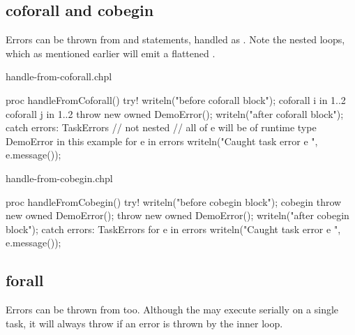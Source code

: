 \subsection{coforall and cobegin}
\label{Errors_coforall_and_cobegin}

Errors can be thrown from  and  statements, handled
as . Note the nested  loops, which as mentioned
earlier will emit a flattened .

\begin{chapelexample}{handle-from-coforall.chpl}
\begin{chapel}
proc handleFromCoforall() {
  try! {
    writeln("before coforall block");
    coforall i in 1..2 {
      coforall j in 1..2 {
        throw new owned DemoError();
      }
    }
    writeln("after coforall block");
  } catch errors: TaskErrors { // not nested
    // all of e will be of runtime type DemoError in this example
    for e in errors {
      writeln("Caught task error e ", e.message());
    }
  }
}
\end{chapel}
\begin{chapelpost}
\end{chapelpost}
\begin{chapeloutput}
\end{chapeloutput}
\end{chapelexample}

\begin{chapelexample}{handle-from-cobegin.chpl}
\begin{chapel}
proc handleFromCobegin() {
  try! {
    writeln("before cobegin block");
    cobegin {
      throw new owned DemoError();
      throw new owned DemoError();
    }
    writeln("after cobegin block");
  } catch errors: TaskErrors {
    for e in errors {
      writeln("Caught task error e ", e.message());
    }
  }
}
\end{chapel}
\begin{chapelpost}
\end{chapelpost}
\begin{chapeloutput}
\end{chapeloutput}
\end{chapelexample}

\subsection{forall}
\label{Errors_forall}

Errors can be thrown from  too. Although the  may execute
serially on a single task, it will always throw  if an error
is thrown by the inner loop.


